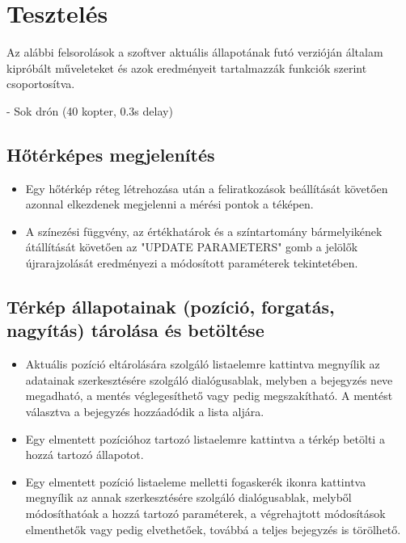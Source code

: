 \section{Tesztelés}

Az alábbi felsorolások a szoftver aktuális állapotának futó verzióján általam
kipróbált műveleteket és azok eredményeit tartalmazzák funkciók szerint
csoportosítva.

 - Sok drón (40 kopter, 0.3s delay)

\subsection{Hőtérképes megjelenítés}

\begin{itemize}

  \item Egy hőtérkép réteg létrehozása után a feliratkozások beállítását
  követően azonnal elkezdenek megjelenni a mérési pontok a téképen.

  \item A színezési függvény, az értékhatárok és a színtartomány bármelyikének
  átállítását követően az "UPDATE PARAMETERS" gomb a jelölők újrarajzolását
  eredményezi a módosított paraméterek tekintetében.

\end{itemize}


\subsection{Térkép állapotainak (pozíció, forgatás, nagyítás) tárolása és betöltése}

\begin{itemize}

  \item Aktuális pozíció eltárolására szolgáló listaelemre kattintva megnyílik
  az adatainak szerkesztésére szolgáló dialógusablak, melyben a bejegyzés neve
  megadható, a mentés véglegesíthető vagy pedig megszakítható. A mentést
  választva a bejegyzés hozzáadódik a lista aljára.

  \item Egy elmentett pozícióhoz tartozó listaelemre kattintva a térkép betölti
  a hozzá tartozó állapotot.

  \item Egy elmentett pozíció listaeleme melletti fogaskerék ikonra kattintva
  megnyílik az annak szerkesztésére szolgáló dialógusablak, melyből
  módosíthatóak a hozzá tartozó paraméterek, a végrehajtott módosítások
  elmenthetők vagy pedig elvethetőek, továbbá a teljes bejegyzés is törölhető.

\end{itemize}


